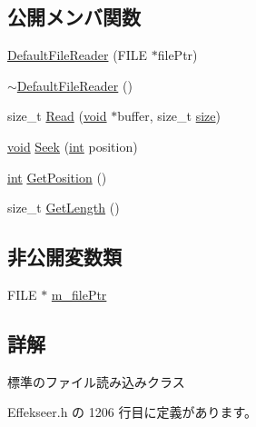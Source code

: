 \subsection*{公開メンバ関数}
\begin{DoxyCompactItemize}
\item 
\mbox{\hyperlink{class_effekseer_1_1_default_file_reader_ad8f7324f6217658c9f3ec1c6db5f9e6b}{Default\+File\+Reader}} (F\+I\+LE $\ast$file\+Ptr)
\item 
\mbox{\hyperlink{class_effekseer_1_1_default_file_reader_adcc437133a5e54acf884fd867d243c96}{$\sim$\+Default\+File\+Reader}} ()
\item 
size\+\_\+t \mbox{\hyperlink{class_effekseer_1_1_default_file_reader_ae00fd8b1031e13bd5a43d74f03d7ed79}{Read}} (\mbox{\hyperlink{namespace_effekseer_ab34c4088e512200cf4c2716f168deb56}{void}} $\ast$buffer, size\+\_\+t \mbox{\hyperlink{namespace_effekseer_a73c68f3d33539d30844b9d1e058077f7}{size}})
\item 
\mbox{\hyperlink{namespace_effekseer_ab34c4088e512200cf4c2716f168deb56}{void}} \mbox{\hyperlink{class_effekseer_1_1_default_file_reader_a9c9e821e4508708a2c91a9ab486b2709}{Seek}} (\mbox{\hyperlink{namespace_effekseer_ace0abf7c2e6947e519ebe8b54cbcc30a}{int}} position)
\item 
\mbox{\hyperlink{namespace_effekseer_ace0abf7c2e6947e519ebe8b54cbcc30a}{int}} \mbox{\hyperlink{class_effekseer_1_1_default_file_reader_a86001f21782b7cb40a5e0ca4ee155aca}{Get\+Position}} ()
\item 
size\+\_\+t \mbox{\hyperlink{class_effekseer_1_1_default_file_reader_a2663a6f3b6bf3aaabadcfe371a85b15d}{Get\+Length}} ()
\end{DoxyCompactItemize}
\subsection*{非公開変数類}
\begin{DoxyCompactItemize}
\item 
F\+I\+LE $\ast$ \mbox{\hyperlink{class_effekseer_1_1_default_file_reader_a8377211af30419cd2a8b6d220fe8972d}{m\+\_\+file\+Ptr}}
\end{DoxyCompactItemize}


\subsection{詳解}
標準のファイル読み込みクラス 

 Effekseer.\+h の 1206 行目に定義があります。



